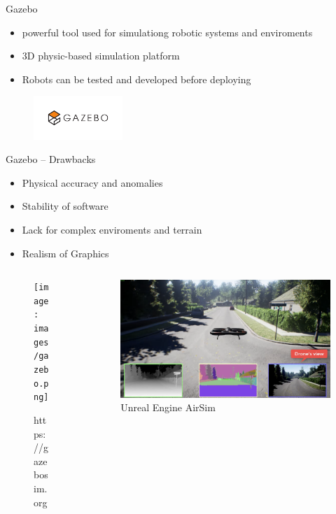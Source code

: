 \documentclass[11pt,t,usepdftitle=false,aspectratio=169]{beamer}
\begin{document}
\begin{frame}{Gazebo}
   \begin{itemize}
      \item powerful tool used for simulationg robotic systems and enviroments
      \item 3D physic-based simulation platform
      \item Robots can be tested and developed before deploying
   \end{itemize}

   \begin{figure}
      \includegraphics[width=0.3\textwidth]{images/gazebo_logo.png}
   \end{figure}
\end{frame}

\begin{frame}{Gazebo -- Drawbacks}
   \begin{itemize}
      \item Physical accuracy and anomalies
      \item Stability of software
      \item Lack for complex enviroments and terrain
      \item Realism of Graphics
   \end{itemize}
   \begin{columns}[c]
      \begin{column}{.5\textwidth}         
         \begin{figure}
            \texttt{[image: images/gazebo.png]}
            \caption{https://gazebosim.org}
         \end{figure}
      \end{column}
      \begin{column}{.5\textwidth}  
         \begin{figure}
            \includegraphics{images/unreal_arisim.png}
            \caption{Unreal Engine AirSim \cite{shah2017airsim}}
         \end{figure}
      \end{column}
   \end{columns}
\end{frame}
\end{document}
